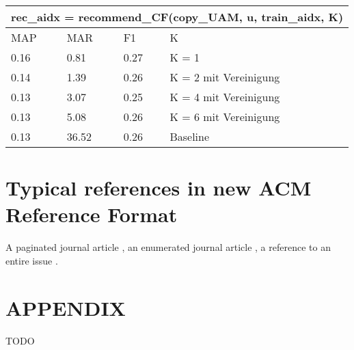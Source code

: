 \documentclass[prodmode,acmtecs]{acmsmall} %
\begin{document}
\begin{center}
	\resizebox{!}{1.5cm} {
    \begin{tabular}{ | l | l | l | l |}
    \hline
    \multicolumn{4}{|c|}{rec\_aidx = recommend\_CF(copy\_UAM, u, train\_aidx, K)} \\ \hline
    MAP & MAR & F1 & K \\ \hline
    0.16 & 0.81 & 0.27 & K = 1 \\ \hline
    0.14 & 1.39 & 0.26 & K = 2 mit Vereinigung \\ \hline
    0.13 & 3.07 & 0.25 & K = 4 mit Vereinigung \\ \hline
    0.13 & 5.08 & 0.26 & K = 6 mit Vereinigung \\ \hline
    0.13 & 36.52 & 0.26 & Baseline \\ 
    \hline
    \end{tabular}
    }
\end{center}


\section{Typical references in new ACM Reference Format}
A paginated journal article \cite{Abril07}, an enumerated
journal article \cite{Cohen07}, a reference to an entire issue \cite{JCohen96}.

\appendix
\section*{APPENDIX}
\setcounter{section}{1}
TODO





\medskip
\end{document}
